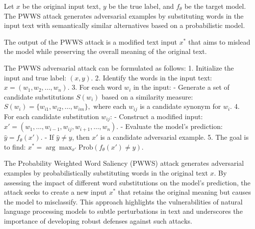 Let \( x \) be the original input text, \( y \) be the true label, and \( f_{\theta} \) be the target model. The PWWS attack generates adversarial examples by substituting words in the input text with semantically similar alternatives based on a probabilistic model.

The output of the PWWS attack is a modified text input \( x^* \) that aims to mislead the model while preserving the overall meaning of the original text.

The PWWS adversarial attack can be formulated as follows:
1. Initialize the input and true label:
   $
   (x, y).
   $
2. Identify the words in the input text:
   $
   x = (w_1, w_2, \ldots, w_n).
   $
3. For each word \( w_i \) in the input:
   - Generate a set of candidate substitutions \( S(w_i) \) based on a similarity measure:
   $
   S(w_i) = \{w_{i1}, w_{i2}, \ldots, w_{im}\},
   $
   where each \( w_{ij} \) is a candidate synonym for \( w_i \).
4. For each candidate substitution \( w_{ij} \):
   - Construct a modified input:
   $
   x' = (w_1, \ldots, w_{i-1}, w_{ij}, w_{i+1}, \ldots, w_n).
   $
   - Evaluate the model's prediction:
   $
   \hat{y} = f_{\theta}(x').
   $
   - If \( \hat{y} \neq y \), then \( x' \) is a candidate adversarial example.
5. The goal is to find:
   $
   x^* = \arg\max_{x'} \text{Prob}(f_{\theta}(x') \neq y).
   $

The Probability Weighted Word Saliency (PWWS) attack generates adversarial examples by probabilistically substituting words in the original text \( x \). By assessing the impact of different word substitutions on the model's prediction, the attack seeks to create a new input \( x^* \) that retains the original meaning but causes the model to misclassify. This approach highlights the vulnerabilities of natural language processing models to subtle perturbations in text and underscores the importance of developing robust defenses against such attacks.
